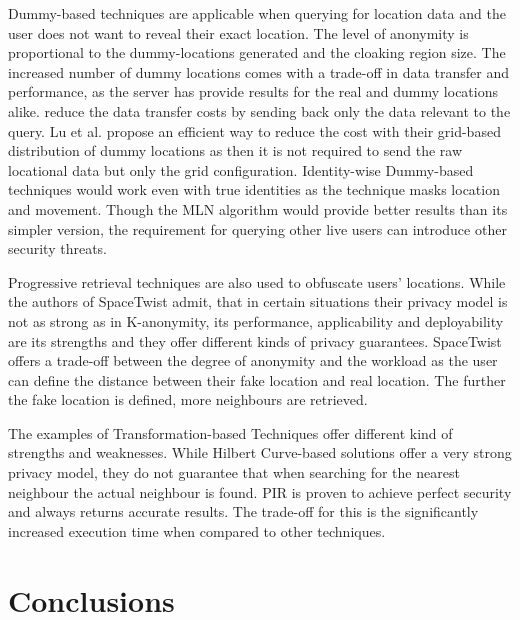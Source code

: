 \documentclass[english]{tktltiki2}
\theoremstyle{definition}
\theoremstyle{remark}
\begin{document}
Dummy-based techniques are applicable when querying for location data and the user does not want to reveal their exact location. The level of anonymity is proportional to the dummy-locations generated and the cloaking region size. The increased number of dummy locations comes with a trade-off in data transfer and performance, as the server has provide results for the real and dummy locations alike. \cite{Kido2005} reduce the data transfer costs by sending back only the data relevant to the query. Lu et al. propose an efficient way to reduce the cost with their grid-based distribution of dummy locations as then it is not required to send the raw locational data but only the grid configuration. Identity-wise Dummy-based techniques would work even with true identities as the technique masks location and movement. Though the MLN algorithm would provide better results than its simpler version, the requirement for querying other live users can introduce other security threats.\par
Progressive retrieval techniques are also used to obfuscate users' locations. While the authors of SpaceTwist\cite{SpaceTwist} admit, that in certain situations their privacy model is not as strong as in K-anonymity, its performance, applicability and deployability are its strengths and they offer different kinds of privacy guarantees. SpaceTwist offers a trade-off between the degree of anonymity and the workload as the user can define the distance between their fake location and real location. The further the fake location is defined, more neighbours are retrieved. \par 
The examples of Transformation-based Techniques offer different kind of strengths and weaknesses. While Hilbert Curve-based solutions \cite{Hilbert, Um2010} offer a very strong privacy model, they do not guarantee that when searching for the nearest neighbour the actual neighbour is found. PIR \cite{Ghinita2008} is proven to achieve perfect security and always returns accurate results. The trade-off for this is the significantly increased execution time when compared to other techniques.
 

\section{Conclusions}
\end{document}
